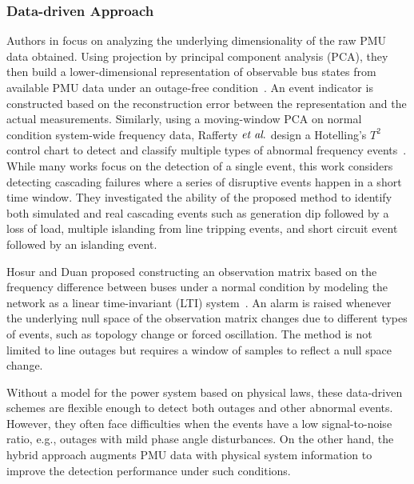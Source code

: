 \subsubsection{Data-driven Approach}
Authors in \cite{Xie2014} focus on analyzing the underlying dimensionality of the raw PMU data obtained. Using projection by principal component analysis (PCA), they then build a lower-dimensional representation of observable bus states from available PMU data under an outage-free condition~\cite{Xie2014}. An event indicator is constructed based on the reconstruction error between the representation and the actual measurements. 
Similarly, using a moving-window PCA on normal condition system-wide frequency data, Rafferty $\textit{et al}.$ design a Hotelling’s $T^2$ control chart to detect and classify multiple types of abnormal frequency events~\cite{Rafferty2016}. While many works focus on the detection of a single event, this work considers detecting cascading failures where a series of disruptive events happen in a short time window. They investigated the ability of the proposed method to identify both simulated and real cascading events such as generation dip followed by a loss of load, multiple islanding from line tripping events, and short circuit event followed by an islanding event.

Hosur and Duan proposed constructing an observation matrix based on the frequency difference between buses under a normal condition by modeling the network as a linear time-invariant (LTI) system~\cite{Hosur2019}. An alarm is raised whenever the underlying null space of the observation matrix changes due to different types of events, such as topology change or forced oscillation. The method is not limited to line outages but requires a window of samples to reflect a null space change. 

Without a model for the power system based on physical laws, these data-driven schemes are flexible enough to detect both outages and other abnormal events. However, they often face difficulties when the events have a low signal-to-noise ratio, e.g., outages with mild phase angle disturbances. On the other hand, the hybrid approach augments PMU data with physical system information to improve the detection performance under such conditions.

